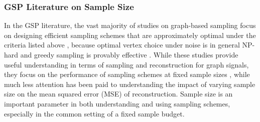 \subsubsection{GSP Literature on Sample Size}
In the GSP literature, the vast majority of studies on graph-based sampling focus on designing efficient sampling schemes that are approximately optimal under the criteria listed above \cite[Chapter 6]{pukelsheim2006optimal}, because optimal vertex choice under noise is in general NP-hard \cite{nikolov2022proportional} and greedy sampling is provably effective \cite{chamon2017greedy}. While these studies provide useful understanding in terms of sampling and reconstruction for graph signals, they focus on the performance of sampling schemes at fixed sample sizes \cite{xie2019bayesian, puy2018random,shomorony2014sampling, tremblay2017determinantal,wang2018optimal,wang2019low, bai2020fast,  anis2016efficient}, while much less attention has been paid to understanding the impact of varying sample size on the mean squared error (MSE) of reconstruction. Sample size is an important parameter in both understanding and using sampling schemes, especially in the common setting of a fixed sample budget. %

